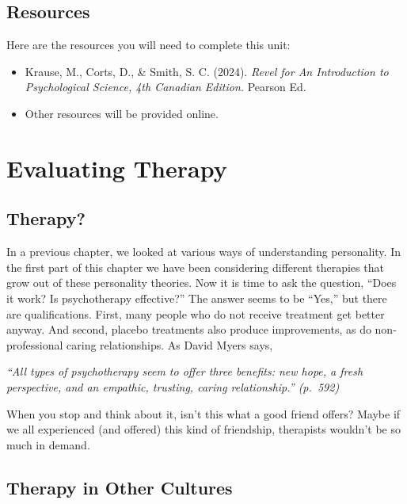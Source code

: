 \documentclass[
]{book}
\providecommand{\tightlist}{%
  \setlength{\itemsep}{0pt}\setlength{\parskip}{0pt}}
\begin{document}
\hypertarget{resources-11}{%
\subsection*{Resources}\label{resources-11}}

Here are the resources you will need to complete this unit:

\begin{itemize}
\tightlist
\item
  Krause, M., Corts, D., \& Smith, S. C. (2024). \emph{Revel for An Introduction to Psychological Science, 4th Canadian Edition.} Pearson Ed.\\
\item
  Other resources will be provided online.
\end{itemize}

\hypertarget{evaluating-therapy}{%
\section{Evaluating Therapy}\label{evaluating-therapy}}

\hypertarget{therapy}{%
\subsection*{Therapy?}\label{therapy}}

In a previous chapter, we looked at various ways of understanding personality. In the first part of this chapter we have been considering different therapies that grow out of these personality theories. Now it is time to ask the question, ``Does it work? Is psychotherapy effective?'' The answer seems to be ``Yes,'' but there are qualifications. First, many people who do not receive treatment get better anyway. And second, placebo treatments also produce improvements, as do non-professional caring relationships. As David Myers says,

\emph{``All types of psychotherapy seem to offer three benefits: new hope, a fresh perspective, and an empathic, trusting, caring relationship.'' (p.~592)}

When you stop and think about it, isn't this what a good friend offers? Maybe if we all experienced (and offered) this kind of friendship, therapists wouldn't be so much in demand.

\hypertarget{therapy-in-other-cultures}{%
\subsection*{Therapy in Other Cultures}\label{therapy-in-other-cultures}}
\end{document}
